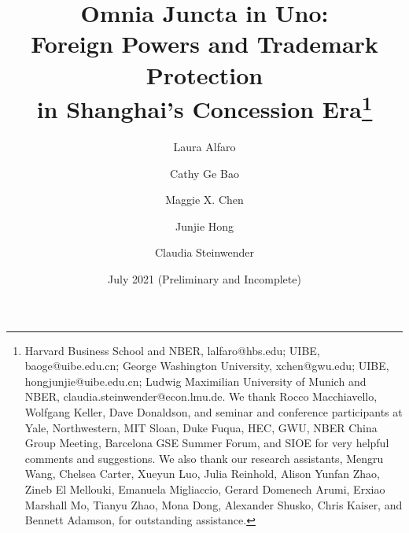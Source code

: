 \documentclass[12pt]{article}
\begin{document}
\begin{spacing}{1.2}
\begin{titlepage}

\title{Omnia Juncta in Uno: \\ Foreign Powers and Trademark Protection \\ in Shanghai's Concession Era\thanks{Harvard Business School and NBER, lalfaro@hbs.edu; UIBE, baoge@uibe.edu.cn; George Washington University, xchen@gwu.edu; UIBE, hongjunjie@uibe.edu.cn; Ludwig Maximilian University of Munich and NBER, claudia.steinwender@econ.lmu.de. We thank Rocco Macchiavello, Wolfgang Keller, Dave Donaldson, and seminar and conference participants at Yale, Northwestern, MIT Sloan, Duke Fuqua, HEC, GWU, NBER China Group Meeting, Barcelona GSE Summer Forum, and SIOE for very helpful comments and suggestions. %
We also thank our research assistants, Mengru Wang, Chelsea Carter, Xueyun Luo, Julia Reinhold, Alison Yunfan Zhao, Zineb El Mellouki, Emanuela Migliaccio, Gerard Domenech Arumi, Erxiao Marshall Mo, Tianyu Zhao, Mona Dong, Alexander Shusko, Chris Kaiser, and Bennett Adamson, for outstanding assistance.}} 



\vspace{-1.5cm}

\author{Laura Alfaro  \and  Cathy Ge Bao \and  Maggie X. Chen  \and Junjie Hong  \and Claudia Steinwender}

\vspace{-1.5cm}
\date{July 2021 (Preliminary and Incomplete)}

\maketitle
\vspace{-1cm}


\end{titlepage}
\end{spacing}
\end{document}
